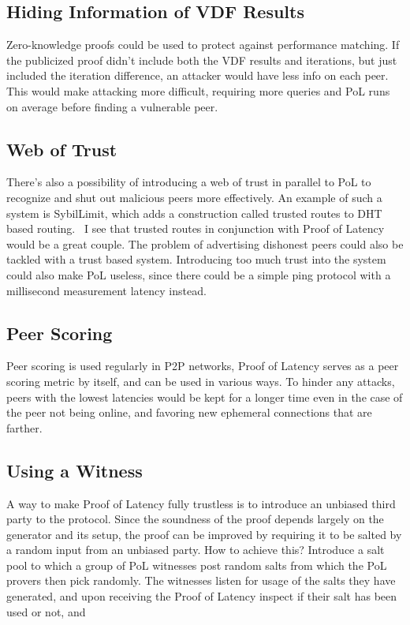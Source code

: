 \subsection{Hiding Information of VDF Results}
Zero-knowledge proofs could be used to protect against performance matching. If the publicized proof didn't include both the VDF results and iterations, but just included the iteration difference, an attacker would have less info on each peer. This would make attacking more difficult, requiring more queries and PoL runs on average before finding a vulnerable peer.

\subsection{Web of Trust}
There's also a possibility of introducing a web of trust in parallel to PoL to recognize and shut out malicious peers more effectively. An example of such a system is SybilLimit, which adds a construction called trusted routes to DHT based routing.~\cite{Yu2008-xl} I see that trusted routes in conjunction with Proof of Latency would be a great couple. The problem of advertising dishonest peers could also be tackled with a trust based system. Introducing too much trust into the system could also make PoL useless, since there could be a simple ping protocol with a millisecond measurement latency instead.
~
\subsection{Peer Scoring}
Peer scoring is used regularly in P2P networks,
Proof of Latency serves as a peer scoring metric by itself, and can be used in various ways. To hinder any attacks, peers with the lowest latencies would be kept for a longer time even in the case of the peer not being online, and favoring new ephemeral connections that are farther.

\subsection{Using a Witness}
A way to make Proof of Latency fully trustless is to introduce an unbiased third party to the protocol. Since the soundness of the proof depends largely on the generator and its setup, the proof can be improved by requiring it to be salted by a random input from an unbiased party. How to achieve this? Introduce a salt pool to which a group of PoL witnesses post random salts from which the PoL provers then pick randomly. The witnesses listen for usage of the salts they have generated, and upon receiving the Proof of Latency inspect if their salt has been used or not, and

